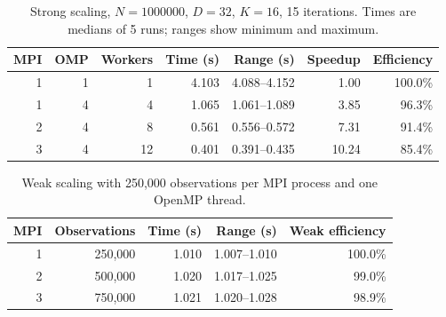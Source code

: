 \begin{table}[H]\centering\small
\caption{Strong scaling, $N=1000000$, $D=32$, $K=16$, 15 iterations. Times are medians of 5 runs; ranges show minimum and maximum.}
\begin{tabular}{rrrrrrr}\toprule
MPI & OMP & Workers & Time (s) & Range (s) & Speedup & Efficiency \\
\midrule
1 & 1 & 1 & 4.103 & 4.088--4.152 & 1.00 & 100.0\% \\
1 & 4 & 4 & 1.065 & 1.061--1.089 & 3.85 & 96.3\% \\
2 & 4 & 8 & 0.561 & 0.556--0.572 & 7.31 & 91.4\% \\
3 & 4 & 12 & 0.401 & 0.391--0.435 & 10.24 & 85.4\% \\
\bottomrule\end{tabular}\label{tab:hpc-one-strong}\end{table}
\begin{table}[H]\centering\small
\caption{Weak scaling with 250,000 observations per MPI process and one OpenMP thread.}
\begin{tabular}{rrrrr}\toprule
MPI & Observations & Time (s) & Range (s) & Weak efficiency \\
\midrule
1 & 250,000 & 1.010 & 1.007--1.010 & 100.0\% \\
2 & 500,000 & 1.020 & 1.017--1.025 & 99.0\% \\
3 & 750,000 & 1.021 & 1.020--1.028 & 98.9\% \\
\bottomrule\end{tabular}\label{tab:hpc-one-weak}\end{table}
